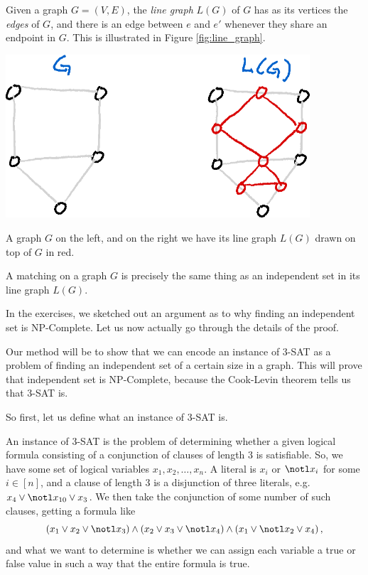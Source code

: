 \documentclass[nobib]{tufte-handout}
\begin{document}
\begin{definition}
    Given a graph $G = (V, E)$, the \emph{line graph} $L(G)$ of $G$ has as its vertices the \emph{edges} of $G$, and there is an edge between $e$ and $e'$ whenever they share an endpoint in $G$. This is illustrated in Figure \ref{fig:line_graph}.
\end{definition}

\begin{marginfigure}
    \centering
    \includegraphics[width=0.85\textwidth]{graphics/L8_vx_covers_hamiltonicity_etc/line_graph.png}
    \caption{A graph $G$ on the left, and on the right we have its line graph $L(G)$ drawn on top of $G$ in red.}
    \label{fig:line_graph}
\end{marginfigure}

\begin{remark}
    A matching on a graph $G$ is precisely the same thing as an independent set in its line graph $L(G)$.
\end{remark}

In the exercises, we sketched out an argument as to why finding an independent set is NP-Complete. Let us now actually go through the details of the proof.

Our method will be to show that we can encode an instance of 3-SAT as a problem of finding an independent set of a certain size in a graph. This will prove that independent set is NP-Complete, because the Cook-Levin theorem tells us that 3-SAT is.

So first, let us define what an instance of 3-SAT is.

\begin{definition}
    An instance of 3-SAT is the problem of determining whether a given logical formula consisting of a conjunction of clauses of length $3$ is satisfiable. So, we have some set of logical variables $x_1, x_2, \ldots, x_n$. A literal is $x_i$ or $\notl x_i$ for some $i \in [n]$, and a clause of length $3$ is a disjunction of three literals, e.g. $x_4\vee \notl x_{10} \vee x_3$. We then take the conjunction of some number of such clauses, getting a formula like
    $$\left(x_1 \vee x_2 \vee \notl x_3\right) \wedge \left(x_2 \vee x_3 \vee \notl x_4\right) \wedge \left(x_1 \vee \notl x_2 \vee x_4\right),$$
    and what we want to determine is whether we can assign each variable a true or false value in such a way that the entire formula is true.
\end{definition}
\end{document}
